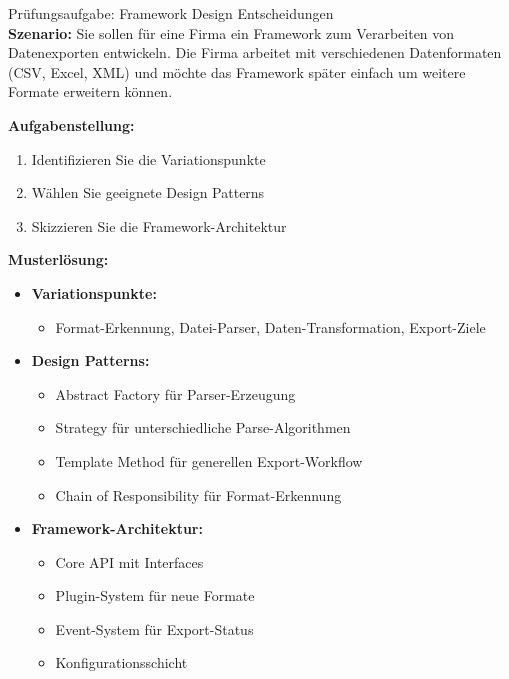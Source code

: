 \begin{example2}{Prüfungsaufgabe: Framework Design Entscheidungen}\\
\textbf{Szenario:}
Sie sollen für eine Firma ein Framework zum Verarbeiten von Datenexporten entwickeln.
Die Firma arbeitet mit verschiedenen Datenformaten (CSV, Excel, XML) und möchte das 
Framework später einfach um weitere Formate erweitern können.

\textbf{Aufgabenstellung:}
\begin{enumerate}
    \item Identifizieren Sie die Variationspunkte
    \item Wählen Sie geeignete Design Patterns
    \item Skizzieren Sie die Framework-Architektur
\end{enumerate}

\textbf{Musterlösung:}
\begin{itemize}
    \item \textbf{Variationspunkte:}
    \begin{itemize}
        \item Format-Erkennung, Datei-Parser, Daten-Transformation, Export-Ziele
    \end{itemize}
    
    \item \textbf{Design Patterns:}
    \begin{itemize}
        \item Abstract Factory für Parser-Erzeugung
        \item Strategy für unterschiedliche Parse-Algorithmen
        \item Template Method für generellen Export-Workflow
        \item Chain of Responsibility für Format-Erkennung
    \end{itemize}
    
    \item \textbf{Framework-Architektur:}
    \begin{itemize}
        \item Core API mit Interfaces
        \item Plugin-System für neue Formate
        \item Event-System für Export-Status
        \item Konfigurationsschicht
    \end{itemize}
\end{itemize}
\end{example2}

